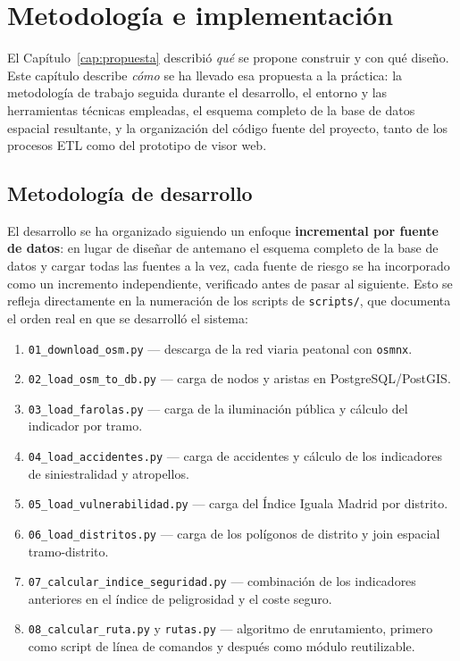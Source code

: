 \chapter{Metodología e implementación}
\label{cap:metodologia}

El Capítulo~\ref{cap:propuesta} describió \textit{qué} se propone construir y con qué diseño. Este capítulo describe \textit{cómo} se ha llevado esa propuesta a la práctica: la metodología de trabajo seguida durante el desarrollo, el entorno y las herramientas técnicas empleadas, el esquema completo de la base de datos espacial resultante, y la organización del código fuente del proyecto, tanto de los procesos ETL como del prototipo de visor web.

\section{Metodología de desarrollo}
\label{sec:metodologia_desarrollo}

El desarrollo se ha organizado siguiendo un enfoque \textbf{incremental por fuente de datos}: en lugar de diseñar de antemano el esquema completo de la base de datos y cargar todas las fuentes a la vez, cada fuente de riesgo se ha incorporado como un incremento independiente, verificado antes de pasar al siguiente. Esto se refleja directamente en la numeración de los scripts de \texttt{scripts/}, que documenta el orden real en que se desarrolló el sistema:

\begin{enumerate}
    \item \texttt{01\_download\_osm.py} — descarga de la red viaria peatonal con \texttt{osmnx}.
    \item \texttt{02\_load\_osm\_to\_db.py} — carga de nodos y aristas en PostgreSQL/PostGIS.
    \item \texttt{03\_load\_farolas.py} — carga de la iluminación pública y cálculo del indicador por tramo.
    \item \texttt{04\_load\_accidentes.py} — carga de accidentes y cálculo de los indicadores de siniestralidad y atropellos.
    \item \texttt{05\_load\_vulnerabilidad.py} — carga del Índice Iguala Madrid por distrito.
    \item \texttt{06\_load\_distritos.py} — carga de los polígonos de distrito y join espacial tramo-distrito.
    \item \texttt{07\_calcular\_indice\_seguridad.py} — combinación de los indicadores anteriores en el índice de peligrosidad y el coste seguro.
    \item \texttt{08\_calcular\_ruta.py} y \texttt{rutas.py} — algoritmo de enrutamiento, primero como script de línea de comandos y después como módulo reutilizable.
\end{enumerate}

